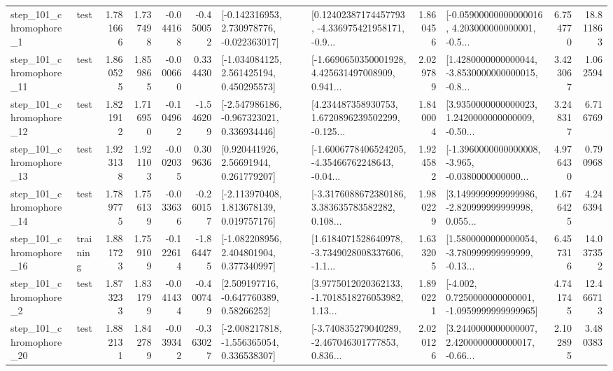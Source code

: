 \begin{tabular}{llrrrrllrlrr}
   step\_101\_chromophore\_1 &      test &      1.781666 &    1.737498 &     -0.044168 & -0.450052 &   [-0.142316953, 2.730978776, -0.022363017] &  [0.12402387174457793, -4.336975421958171, -0.9... &       1.860456 &  [-0.05900000000000016, 4.203000000000001, -0.5... &            6.754770 &         18.811863 \\
  step\_101\_chromophore\_11 &      test &      1.860525 &    1.859865 &     -0.000660 &  0.334430 &    [-1.034084125, 2.561425194, 0.450295573] &  [-1.6690650350001928, 4.425631497008909, 0.941... &       2.029789 &  [1.4280000000000044, -3.8530000000000015, -0.8... &            3.423067 &          1.062594 \\
  step\_101\_chromophore\_12 &      test &      1.821912 &    1.716950 &     -0.104962 & -1.546209 &   [-2.547986186, -0.967323021, 0.336934446] &  [4.234487358930753, 1.6720896239502299, -0.125... &       1.840004 &  [3.9350000000000023, 1.2420000000000009, -0.50... &            3.248317 &          6.716769 \\
  step\_101\_chromophore\_13 &      test &      1.923138 &    1.921103 &     -0.002035 &  0.309636 &      [0.920441926, 2.56691944, 0.261779207] &  [-1.6006778406524205, -4.35466762248643, -0.04... &       1.924582 &  [-1.3960000000000008, -3.965, -0.0380000000000... &            4.976430 &          0.790968 \\
  step\_101\_chromophore\_14 &      test &      1.789775 &    1.756139 &     -0.033636 & -0.260157 &    [-2.113970408, 1.813678139, 0.019757176] &  [-3.3176088672380186, 3.383635783582282, 0.108... &       1.980229 &  [3.1499999999999986, -2.820999999999998, 0.055... &            1.676425 &          4.246394 \\
  step\_101\_chromophore\_16 &  training &      1.881723 &    1.759109 &     -0.122614 & -1.864475 &    [-1.082208956, 2.404801904, 0.377340997] &  [1.6184071528640978, -3.7349028008337606, -1.1... &       1.633205 &  [1.5800000000000054, -3.780999999999999, -0.13... &            6.457316 &         14.037352 \\
   step\_101\_chromophore\_2 &      test &      1.873233 &    1.831799 &     -0.041434 & -0.400749 &     [2.509197716, -0.647760389, 0.58266252] &  [3.9775012020362133, -1.7018518276053982, 1.13... &       1.890221 &  [-4.002, 0.7250000000000001, -1.0959999999999965] &            4.741745 &         12.466713 \\
  step\_101\_chromophore\_20 &      test &      1.882131 &    1.842789 &     -0.039342 & -0.363027 &   [-2.008217818, -1.556365054, 0.336538307] &  [-3.740835279040289, -2.467046301777853, 0.836... &       2.020126 &  [3.2440000000000007, 2.4200000000000017, -0.66... &            2.102895 &          3.480383 \\

\end{tabular}
